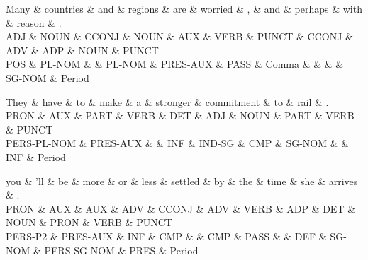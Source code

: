 \begin{dependency}
\begin{deptext}
Many \& countries \& and \& regions \& are \& worried \& , \& and \& perhaps \& with \& reason \& . \\
ADJ \& NOUN \& CCONJ \& NOUN \& AUX \& VERB \& PUNCT \& CCONJ \& ADV \& ADP \& NOUN \& PUNCT \\
POS \& PL-NOM \&  \& PL-NOM \& PRES-AUX \& PASS \& Comma \&  \&  \&  \& SG-NOM \& Period \\
\end{deptext}



\end{dependency}

\begin{dependency}
\begin{deptext}
They \& have \& to \& make \& a \& stronger \& commitment \& to \& rail \& . \\
PRON \& AUX \& PART \& VERB \& DET \& ADJ \& NOUN \& PART \& VERB \& PUNCT \\
PERS-PL-NOM \& PRES-AUX \&  \& INF \& IND-SG \& CMP \& SG-NOM \&  \& INF \& Period \\
\end{deptext}



\end{dependency}

\begin{dependency}
\begin{deptext}
you \& 'll \& be \& more \& or \& less \& settled \& by \& the \& time \& she \& arrives \& . \\
PRON \& AUX \& AUX \& ADV \& CCONJ \& ADV \& VERB \& ADP \& DET \& NOUN \& PRON \& VERB \& PUNCT \\
PERS-P2 \& PRES-AUX \& INF \& CMP \&  \& CMP \& PASS \&  \& DEF \& SG-NOM \& PERS-SG-NOM \& PRES \& Period \\
\end{deptext}



\end{dependency}

